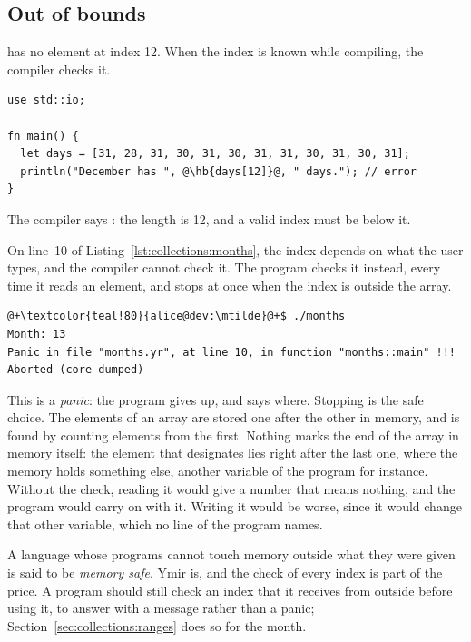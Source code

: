 \subsection{Out of bounds}

 has no element at index 12. When the index is known while
compiling, the compiler checks it.

\begin{lstlisting}[style=coloredverbatimError, escapechar=@, caption=An index past the end of an array]
use std::io;

fn main() {
  let days = [31, 28, 31, 30, 31, 30, 31, 31, 30, 31, 30, 31];
  println("December has ", @\hb{days[12]}@, " days."); // error
}
\end{lstlisting}

The compiler says : the length is 12, and a valid index must be below it.

On line~10 of Listing~\ref{lst:collections:months}, the index depends on what the
user types, and the compiler cannot check it. The program checks it instead,
every time it reads an element, and stops at once when the index is outside the
array.

\begin{lstlisting}[style=bashVerb, escapechar=@+]
@+\textcolor{teal!80}{alice@dev:\mtilde}@+$ ./months
Month: 13
Panic in file "months.yr", at line 10, in function "months::main" !!!
Aborted (core dumped)
\end{lstlisting}

This is a \textit{panic}: the program gives up, and says where. Stopping is the
safe choice. The elements of an array are stored one after the other in memory,
and  is found by counting  elements from the first.
Nothing marks the end of the array in memory itself: the element that
 designates lies right after the last one, where the memory
holds something else, another variable of the program for instance. Without the
check, reading it would give a number that means nothing, and the program would
carry on with it. Writing it would be worse, since it would change that other
variable, which no line of the program names.

A language whose programs cannot touch memory outside what they were given is
said to be \textit{memory safe}. Ymir is, and the check of every index is part
of the price. A program should still check an index that it receives from
outside before using it, to answer with a message rather than a panic;
Section~\ref{sec:collections:ranges} does so for the month.

